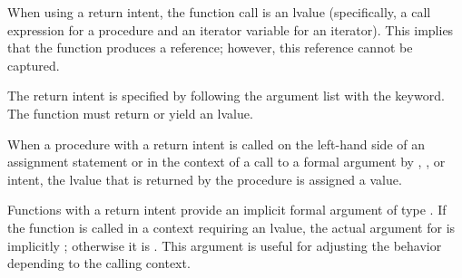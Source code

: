 When using a  return intent, the function call is an lvalue
(specifically, a call expression for a procedure and an iterator variable for
an iterator).  This implies that the function produces a reference; however,
this reference cannot be captured.

The  return intent is specified by following the argument list with
the  keyword.  The function must return or yield an lvalue.

When a procedure with a  return intent is called on the left-hand
side of an assignment statement or in the context of a call to a formal
argument by , , or  intent, the lvalue that is
returned by the procedure is assigned a value.

Functions with a  return intent provide an implicit 
formal argument  of type .  If the function is called
in a context requiring an lvalue, the actual argument for  is
implicitly ; otherwise it is .  This argument is useful
for adjusting the behavior depending to the calling context.

